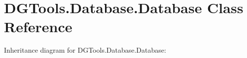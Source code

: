 \hypertarget{class_d_g_tools_1_1_database_1_1_database}{}\section{D\+G\+Tools.\+Database.\+Database Class Reference}
\label{class_d_g_tools_1_1_database_1_1_database}


Inheritance diagram for D\+G\+Tools.\+Database.\+Database\+:

